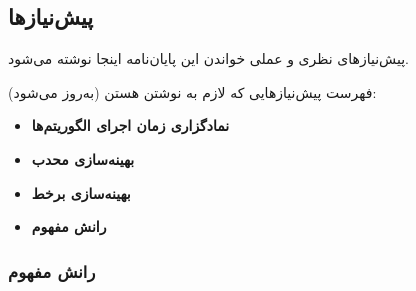 \documentclass[a4paper,11px]{article}
\newcommand{\basepath}{../}
\begin{document}
\subsection{
پیش‌نیازها
}

پیش‌نیازهای نظری و عملی خواندن این پایان‌نامه اینجا نوشته می‌شود.


فهرست پیش‌نیازهایی که لازم به نوشتن هستن (به‌روز می‌شود):
\begin{itemize}
\item {\bf
نمادگزاری زمان اجرای الگوریتم‌ها
}


\item {\bf
بهینه‌سازی محدب
}

\item {\bf
بهینه‌سازی برخط
}

\item {\bf
رانش مفهوم
}

\end{itemize}



















\subsubsection{
رانش مفهوم
}
\end{document}
